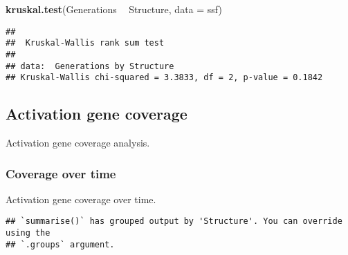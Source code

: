 \documentclass[]{book}
\newenvironment{Shaded}{\begin{snugshade}}{\end{snugshade}}
\newcommand{\CharTok}[1]{\textcolor[rgb]{0.31,0.60,0.02}{#1}}
\newcommand{\CommentTok}[1]{\textcolor[rgb]{0.56,0.35,0.01}{\textit{#1}}}
\newcommand{\DataTypeTok}[1]{\textcolor[rgb]{0.13,0.29,0.53}{#1}}
\newcommand{\KeywordTok}[1]{\textcolor[rgb]{0.13,0.29,0.53}{\textbf{#1}}}
\newcommand{\NormalTok}[1]{#1}
\newcommand{\OperatorTok}[1]{\textcolor[rgb]{0.81,0.36,0.00}{\textbf{#1}}}
\newcommand{\StringTok}[1]{\textcolor[rgb]{0.31,0.60,0.02}{#1}}
\begin{document}
\begin{Shaded}
\begin{Highlighting}[]
\KeywordTok{kruskal.test}\NormalTok{(Generations }\OperatorTok{~}\StringTok{ }\NormalTok{Structure, }\DataTypeTok{data =}\NormalTok{ ssf)}
\end{Highlighting}
\end{Shaded}

\begin{verbatim}
## 
##  Kruskal-Wallis rank sum test
## 
## data:  Generations by Structure
## Kruskal-Wallis chi-squared = 3.3833, df = 2, p-value = 0.1842
\end{verbatim}

\hypertarget{activation-gene-coverage-3}{%
\subsection{Activation gene coverage}\label{activation-gene-coverage-3}}

Activation gene coverage analysis.

\hypertarget{coverage-over-time-6}{%
\subsubsection{Coverage over time}\label{coverage-over-time-6}}

Activation gene coverage over time.

\begin{Shaded}
\end{Shaded}

\begin{verbatim}
## `summarise()` has grouped output by 'Structure'. You can override using the
## `.groups` argument.
\end{verbatim}
\end{document}
